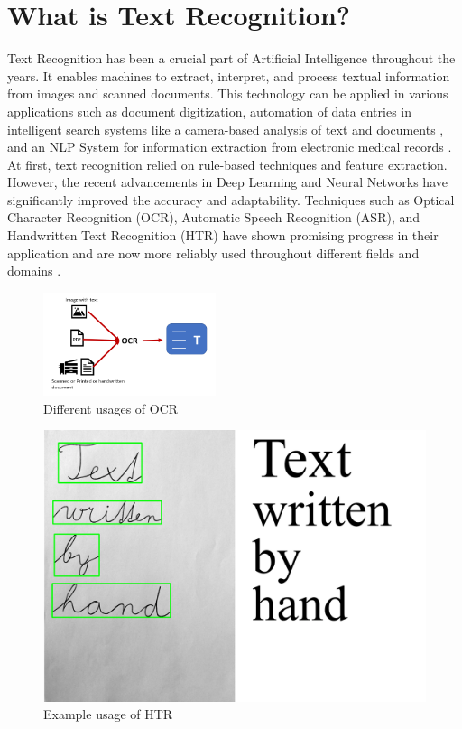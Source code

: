\section{What is Text Recognition?}
Text Recognition has been a crucial part of Artificial Intelligence throughout the years. It enables machines to extract, interpret, and process textual information from images and scanned documents. This technology can be applied in various applications such as document digitization, automation of data entries in intelligent search systems like a camera-based analysis of text and documents \cite{liang2005camera}, and an NLP System for information extraction from electronic medical records \cite{savova2010mayo}. At first, text recognition relied on rule-based techniques and feature extraction. However, the recent advancements in Deep Learning and Neural Networks have significantly improved the accuracy and adaptability. Techniques such as Optical Character Recognition (OCR), Automatic Speech Recognition (ASR), and Handwritten Text Recognition (HTR) have shown promising progress in their application and are now more reliably used throughout different fields and domains \cite{alkendi2024advancements, mori1992historical, karpagavalli2016review}. %
\vspace{-0.5cm}
\begin{figure}[H]
    \centering
    \includegraphics[width=0.45\textwidth]{Figures/Chapter 1/OCR_example.png}
    \caption{Different usages of OCR}
    \label{fig:ocrexamples}
\end{figure}

\begin{figure}[H]
   \centering
    \includegraphics[height=0.2\textwidth]{Figures/Chapter 1/HTR_example.png}
    \caption{Example usage of HTR}
    \label{fig:HTRexamples}
\end{figure}


